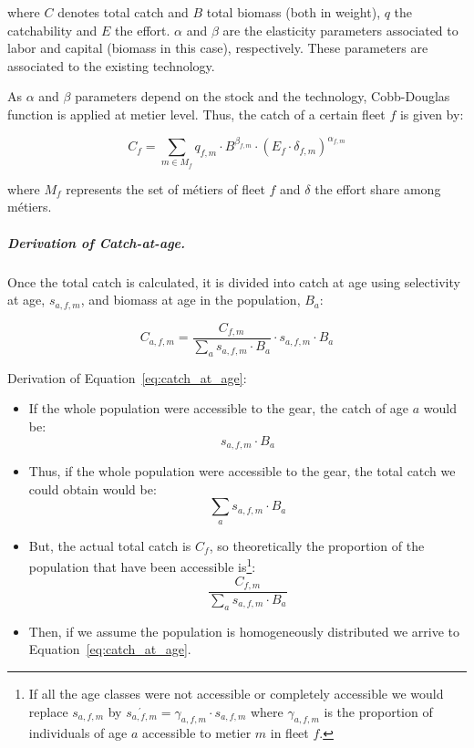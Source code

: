   \noindent	where $C$ denotes total catch and $B$ total biomass (both in weight), $q$ the catchability and $E$ the effort. 
	$\alpha$ and $\beta$ are the elasticity parameters associated to labor and capital 
	(biomass in this case), respectively. These parameters are associated
	to the existing technology. 

	As $\alpha$ and $\beta$ parameters depend on the stock and the technology, Cobb-Douglas function is
	applied at metier level. Thus, the catch of a certain fleet $f$ is given by:

\begin{equation}  \label{eq:Cobb_Doug_fleet}
	C_f = \sum_{m \in M_f} q_{f,m}\cdot B^{\beta _{f,m}} \cdot (E_f\cdot \delta_{f,m})^{\alpha_{f,m}}
\end{equation}
 
	\noindent where $M_f$ represents the set of m\'etiers of fleet $f$ and $\delta$ the effort share among m\'etiers.


	\subparagraph{Derivation of Catch-at-age.}
	Once the total catch is calculated, it is divided into catch at age using selectivity at age, $s_{a,f,m}$, and
	biomass at age in the population, $B_{a}$:
		
	\begin{equation}  \label{eq:catch_at_age}
		C_{a,f,m} = \frac{C_{f,m}}{\sum_a s_{a,f,m}\cdot B_a} \cdot s_{a,f,m}\cdot B_a
	\end{equation}
	
	Derivation of Equation~\ref{eq:catch_at_age}:
			
	\begin{itemize}
		\item If the whole population were accessible to the gear, the catch of age $a$ would be:
			$$s_{a,f,m}\cdot B_a$$
		\item Thus, if the whole population were accessible to the gear, the total catch we could obtain would be:
			$$\sum_a s_{a,f,m}\cdot B_a$$ 
		\item But, the actual total catch is $C_f$, so theoretically the proportion of the population that have been
		  accessible is\footnote{If all the age classes were not accessible or completely accessible
		 we would replace $s_{a,f,m}$ by $\acute{s_{a,f,m}} = \gamma_{a,f,m} \cdot s_{a,f,m}$ where $\gamma_{a,f,m}$ 
		 is the proportion of individuals of age $a$ accessible to metier $m$ in fleet $f$.}:
			$$\frac{C_{f,m}}{\sum_a s_{a,f,m}\cdot B_a}$$ 

		\item Then, if we assume the population is homogeneously distributed we arrive to Equation~\ref{eq:catch_at_age}.
	\end{itemize}
		
